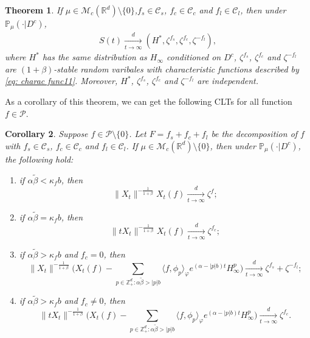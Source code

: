\documentclass[12pt,a4paper]{amsart}
\theoremstyle{plain}
\newtheorem{thm}{Theorem}[section]
\newtheorem{cor}[thm]{Corollary}
\theoremstyle{definition}
\numberwithin{equation}{section}
\begin{document}
\begin{thm}
  \label{thm:M}
 If $\mu\in \mathcal M_c(\mathbb R^d)\setminus \{0\}$,$f_s\in \mathcal C_s$, $f_c \in \mathcal C_c$ and $f_l \in \mathcal C_l$, then under $\mathbb{P}_{\mu}(\cdot|D^c)$,
\begin{align}
S(t)
\xrightarrow[t\rightarrow \infty]{d}(H^*,\zeta^{f_s},\zeta^{f_c},\zeta^{-f_l}),
\end{align}
where $H^*$ has the same distribution as $H_{\infty}$ conditioned on $D^c$, $\zeta^{f_s}$, $\zeta^{f_c}$ and $\zeta^{-f_l}$ are $(1+\beta)$-stable random varibales with characteristic functions described by \eqref{eq: charac func11}. Moreover, $H^*$,  $\zeta^{f_s}$, $\zeta^{f_c}$ and $\zeta^{-f_l}$ are independent.
\end{thm}

As a corollary of this theorem, we can get the following CLTs for all function $f\in \mathcal P$.

\begin{cor} Suppose $f\in \mathcal P\setminus\{0\}$. Let $F=f_s + f_c + f_l$ be the decomposition of $f$ with $f_s \in \mathcal C_s$, $f_c \in \mathcal C_c$ and $f_l \in \mathcal C_l$.
If $\mu\in \mathcal M_c(\mathbb R^d)\setminus \{0\}$, then under $\mathbb{P}_{\mu}(\cdot|D^c)$, the following hold:
\begin{enumerate}
\item if $\alpha \tilde \beta < \kappa_f b$, then
\[
\|X_t\|^{- \frac{1}{1+\beta}} X_t(f)  \xrightarrow[t\to \infty]{d} \zeta^f;
\]
\item if $\alpha \tilde \beta = \kappa_f b$, then
\[
\|t X_t\|^{-\frac{1}{1+\beta}} X_t(f) \xrightarrow[t\to \infty]{d} \zeta^{f_c};
\]
\item  if $\alpha \tilde \beta > \kappa_f b$ and $f_c=0$, then
\[
   \|X_t\|^{-\frac{1}{1+\beta}} \Big( X_t(f) - \sum_{p\in \mathbb Z^d_+:\alpha \tilde \beta>|p|b}\langle f,\phi_p\rangle_\varphi e^{(\alpha-|p|b)t}H^p_{\infty}\Big)
    \xrightarrow[t\to \infty]{d}
     \zeta^{f_s}+\zeta^{-f_l};
\]
\item  if $\alpha \tilde \beta > \kappa_f b$ and $f_c\neq0$, then
\[
 \|t X_t\|^{-\frac{1}{1+\beta}}\Big( X_t(f) - \sum_{p\in \mathbb Z^d_+:\alpha \tilde \beta>|p|b}\langle f,\phi_p\rangle_\varphi e^{(\alpha-|p|b)t}H^p_{\infty}\Big)
    \xrightarrow[t\to \infty]{d}\zeta^{f_c}.
\]
\end{enumerate}
\end{cor}
\end{document}
